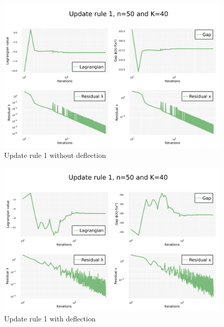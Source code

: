 \documentclass[notitlepage]{article}
\begin{document}
\begin{figure}[H]
  \centering
  \includegraphics[scale=0.25]{pics/psd_q/Rule=1_n=50_K=40_defl=false.png}
  \caption{Update rule 1 without deflection}
  \label{fig:rule-1-n-50-k-40-psdQ}
\end{figure}

\begin{figure}[H]
  \centering
  \includegraphics[scale=0.25]{pics/psd_q/Rule=1_n=50_K=40_defl=true.png}
  \caption{Update rule 1 with deflection}
  \label{fig:rule-1-n-50-k-40-defl-psdQ}
\end{figure}

\newpage
\end{document}
